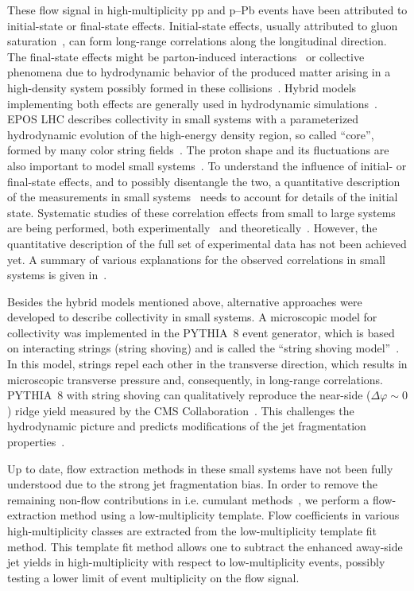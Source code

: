 These flow signal in high-multiplicity pp and p--Pb events have been attributed to initial-state or final-state effects. Initial-state effects, usually attributed to gluon saturation~\cite{Dusling:2012cg,Bzdak:2013zma}, can form long-range
correlations along the longitudinal direction. The final-state effects might be parton-induced interactions~\cite{Arbuzov:2011yr} or collective phenomena due to hydrodynamic behavior of the produced matter arising in a high-density system possibly formed in these collisions~\cite{Weller:2017tsr,Zhao:2017rgg}. 
Hybrid models implementing both effects are generally used in hydrodynamic simulations~\cite{Greif:2017bnr,Mantysaari:2017cni}. EPOS LHC describes collectivity in small systems with a parameterized hydrodynamic evolution of the high-energy density region, so called ``core'', formed by many color string fields~\cite{Pierog:2013ria}.
The proton shape and its fluctuations are also important to model small systems~\cite{Mantysaari:2017cni}.
To understand the influence of initial- or final-state effects, and to possibly disentangle the two, a quantitative description of the measurements in small systems~\cite{Schenke:2019pmk,Schenke:2020mbo} needs to account for details of the initial state.
Systematic studies of these correlation effects from small to large systems are being performed, both experimentally~\cite{Acharya:2019vdf} and theoretically~\cite{Schenke:2020mbo}.
However, the quantitative description of the full set of experimental data has not been achieved yet.
A summary of various explanations for the observed correlations in small systems is given in~\cite{Strickland:2018exs,Loizides:2016tew,Nagle:2018nvi,Loizides:2016tew}.

Besides the hybrid models mentioned above, alternative approaches were developed to describe collectivity in small systems. A microscopic model for collectivity was implemented in the PYTHIA~8 event generator, which is based on interacting strings (string shoving) and is called the “string shoving model”~\cite{Bierlich:2017vhg}. In this model, strings repel each other in the transverse direction, which results in microscopic transverse pressure and, consequently, in long-range correlations. PYTHIA~8 with string shoving can qualitatively reproduce the near-side ($\Delta\varphi\sim0$) ridge yield measured by the CMS Collaboration~\cite{Khachatryan:2016txc}. This challenges the hydrodynamic picture and predicts modifications of the jet fragmentation properties~\cite{Bierlich:2019ixq}.

Up to date, flow extraction methods in these small systems have not been fully understood due to the strong jet fragmentation bias. In order to remove the remaining non-flow contributions in i.e. cumulant methods~\cite{Acharya:2019vdf}, we perform a flow-extraction method using a low-multiplicity template. Flow coefficients in various high-multiplicity classes are extracted from the low-multiplicity template fit method. This template fit method allows one to subtract the enhanced away-side jet yields in high-multiplicity with respect to low-multiplicity events, possibly testing a lower limit of event multiplicity on the flow signal.

